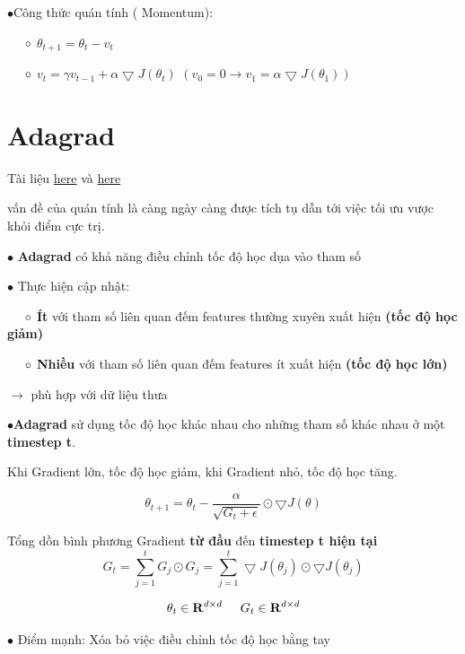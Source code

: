 \documentclass[final,letterpaper,twoside,12pt]{report}
\begin{document}
$\bullet$Công thức quán tính ( Momentum):

$\hspace*{0.5cm} \circ$ $\theta_{t+1} = \theta_t - v_t$

$\hspace*{0.5cm} \circ$ $v_t = \gamma v_{t-1} +\alpha \bigtriangledown J(\theta_{t})$ $(v_0 = 0 \rightarrow v_1 = \alpha \bigtriangledown J(\theta_{1}))$


\section{Adagrad}
Tài liệu \href{https://d2l.aivivn.com/chapter_optimization/adagrad_vn.ht}{here} và \href{https://optimization.cbe.cornell.edu/index.php?title=AdaGrad}{here}

vấn đề của quán tính là càng ngày càng được tích tụ dẫn tới việc tối ưu vược khỏi điểm cực trị.

$\bullet$ \textbf{\color{red}Adagrad} có khả năng điều chỉnh tốc độ học dụa vào tham số

$\bullet$ Thực hiện cập nhật:

$\hspace*{0.5cm}\circ$ \textbf{\color{red}Ít} với tham số liên quan đếm features thường xuyên xuất hiện \textbf{\color{red}(tốc độ học giảm)}

$\hspace*{0.5cm}\circ$ \textbf{\color{red}Nhiều} với tham số liên quan đếm features ít xuất hiện \textbf{\color{red}(tốc độ học lớn)}

$\rightarrow$ phù hợp với dữ liệu thưa

$\bullet$\textbf{\color{red}Adagrad} sử dụng tốc độ học khác nhau cho những tham số khác nhau ở một \textbf{timestep t}.

Khi Gradient lớn, tốc độ học giảm, khi Gradient nhỏ, tốc độ học tăng.

$$\theta_{t+1} = \theta_t - \dfrac{\alpha}{\sqrt{G_t+\epsilon}}\odot \bigtriangledown J(\theta)$$

Tổng dồn bình phương Gradient \textbf{\color{red}từ đầu} đến \textbf{\color{red}timestep t hiện tại}
\[
	G_t = \sum_{j=1}^{t} G_j \odot G_j = \sum_{j=1}^{t} \bigtriangledown J(\theta_j) \odot\bigtriangledown J(\theta_j)
\]

\[
	\theta_t \in \mathbf{R}^{d\times d}   \hspace*{0.5cm} G_t \in \mathbf{R}^{d \times d }
\]

$\bullet$ Điểm mạnh: Xóa bỏ việc điều chỉnh tốc độ học bằng tay
\end{document}
